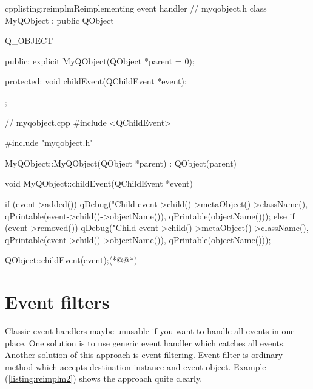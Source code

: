 \begin{fdoccode}{cpp}{listing:reimplm}{Reimplementing event handler}
// myqobject.h
class MyQObject : public QObject{
	Q_OBJECT

    public:
		explicit MyQObject(QObject *parent = 0);

    protected:
		void childEvent(QChildEvent *event);
};

// myqobject.cpp
#include <QChildEvent>

#include "myqobject.h"


MyQObject::MyQObject(QObject *parent) : QObject(parent) {
}

void MyQObject::childEvent(QChildEvent *event) {
    if (event->added()) {
		qDebug("Child %
	       	event->child()->metaObject()->className(),
	       	qPrintable(event->child()->objectName()),
	       	qPrintable(objectName()));
    }
    else if (event->removed()) {
		qDebug("Child %
	       	event->child()->metaObject()->className(),
	       	qPrintable(event->child()->objectName()),
	       	qPrintable(objectName()));
    }

    QObject::childEvent(event);(*@\label{listing:handl}@*)
}
\end{fdoccode}


\section{Event filters}
Classic event handlers maybe unusable if you want to handle all events in one place. One solution is to use generic event handler which catches all events. Another solution of this approach is event filtering. Event filter is ordinary method which accepts destination instance and event object. Example (\autoref{listing:reimplm2}) shows the approach quite clearly.

